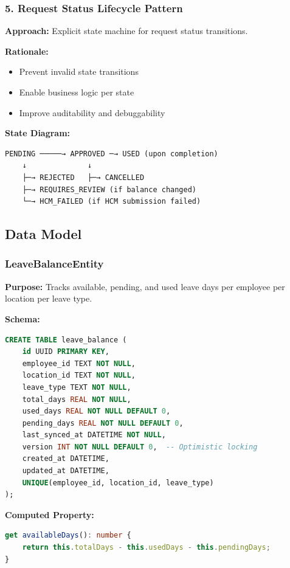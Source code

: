 \documentclass[12pt,a4paper]{article}
\begin{document}
\subsubsection{5. Request Status Lifecycle Pattern}

\textbf{Approach:} Explicit state machine for request status transitions.

\textbf{Rationale:}
\begin{itemize}
    \item Prevent invalid state transitions
    \item Enable business logic per state
    \item Improve auditability and debuggability
\end{itemize}

\textbf{State Diagram:}
\begin{verbatim}
PENDING ─────→ APPROVED ─→ USED (upon completion)
    ↓              ↓
    ├─→ REJECTED   ├─→ CANCELLED
    ├─→ REQUIRES_REVIEW (if balance changed)
    └─→ HCM_FAILED (if HCM submission failed)
\end{verbatim}

\subsection{Data Model}

\subsubsection{LeaveBalanceEntity}

\textbf{Purpose:} Tracks available, pending, and used leave days per employee per location per leave type.

\textbf{Schema:}
\begin{lstlisting}[language=SQL]
CREATE TABLE leave_balance (
    id UUID PRIMARY KEY,
    employee_id TEXT NOT NULL,
    location_id TEXT NOT NULL,
    leave_type TEXT NOT NULL,
    total_days REAL NOT NULL,
    used_days REAL NOT NULL DEFAULT 0,
    pending_days REAL NOT NULL DEFAULT 0,
    last_synced_at DATETIME NOT NULL,
    version INT NOT NULL DEFAULT 0,  -- Optimistic locking
    created_at DATETIME,
    updated_at DATETIME,
    UNIQUE(employee_id, location_id, leave_type)
);
\end{lstlisting}

\textbf{Computed Property:}
\begin{lstlisting}[language=TypeScript]
get availableDays(): number {
    return this.totalDays - this.usedDays - this.pendingDays;
}
\end{lstlisting}
\end{document}
